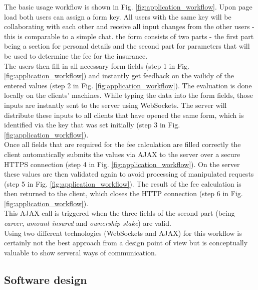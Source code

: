 The basic usage workflow is shown in Fig. \ref{fig:application_workflow}.
Upon page load both users can assign a form key. All users with the same key
will be collaborating with each other and receive all input changes from the
other users - this is comparable to a simple chat.
the form consists of two parts - the first part being a section for personal
details and the second part for parameters that will be used to determine the
fee for the insurance.\\
The users then fill in all necessary form fields (step 1 in Fig.
\ref{fig:application_workflow}) and instantly get feedback on the vailidy of the
entered values (step 2 in Fig. \ref{fig:application_workflow}).
The evaluation is done locally on the clients' machines.
While typing the data into the form fields, those inputs are instantly sent to
the server using WebSockets.
The server will distribute these inputs to all clients that have opened the same
form, which is identified via the key that was set initially (step 3 in Fig.
\ref{fig:application_workflow}).\\
Once all fields that are required for the fee calculation are filled correctly
the client automatically submits the values via AJAX to the server over a secure
HTTPS connection (step 4 in Fig. \ref{fig:application_workflow}). On the server
these values are then validated again to avoid processing of manipulated requests
(step 5 in Fig. \ref{fig:application_workflow}). The result of the fee calculation
is then returned to the client, which closes the HTTP connection (step 6 in Fig. \ref{fig:application_workflow}).\\
This AJAX call is triggered when the three fields of the second part (being
\textit{career}, \textit{amount insured} and \textit{ownership stake}) are
valid.\\
Using two different technologies (WebSockets and AJAX) for this workflow is
certainly not the best approach from a design point of view but is conceptually
valuable to show serveral ways of communication.






\FloatBarrier
\subsection{Software design}
\label{software_design}

